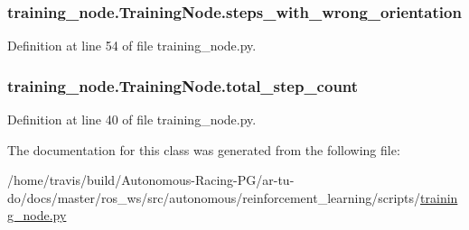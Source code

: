 \subsubsection[{\texorpdfstring{steps\+\_\+with\+\_\+wrong\+\_\+orientation}{steps_with_wrong_orientation}}]{\setlength{\rightskip}{0pt plus 5cm}training\+\_\+node.\+Training\+Node.\+steps\+\_\+with\+\_\+wrong\+\_\+orientation}\hypertarget{classtraining__node_1_1_training_node_a5071298f930b17235e45e1b1cedb02f5}{}\label{classtraining__node_1_1_training_node_a5071298f930b17235e45e1b1cedb02f5}


Definition at line 54 of file training\+\_\+node.\+py.

\subsubsection[{\texorpdfstring{total\+\_\+step\+\_\+count}{total_step_count}}]{\setlength{\rightskip}{0pt plus 5cm}training\+\_\+node.\+Training\+Node.\+total\+\_\+step\+\_\+count}\hypertarget{classtraining__node_1_1_training_node_a3a5dfc28c6625a91f18ca7f8ddfbb8e6}{}\label{classtraining__node_1_1_training_node_a3a5dfc28c6625a91f18ca7f8ddfbb8e6}


Definition at line 40 of file training\+\_\+node.\+py.



The documentation for this class was generated from the following file\+:\begin{DoxyCompactItemize}
\item 
/home/travis/build/\+Autonomous-\/\+Racing-\/\+P\+G/ar-\/tu-\/do/docs/master/ros\+\_\+ws/src/autonomous/reinforcement\+\_\+learning/scripts/\hyperlink{training__node_8py}{training\+\_\+node.\+py}\end{DoxyCompactItemize}
